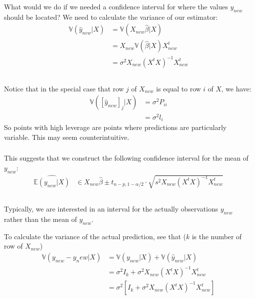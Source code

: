 \begin{frame}[fragile] \frametitle{}

What would we do if we needed a confidence interval for where
the values $y_{new}$ should be located? \pause We need to
calculate the variance of our estimator:
\begin{align*}
\mathbb{V} (\hat{y}_{new} | X) &= \mathbb{V} ( X_{new} \widehat{\beta} | X ) \\
&= X_{new} \mathbb{V} (\widehat{\beta} | X) X_{new}^t \\
&= \sigma^2 X_{new} (X^t X)^{-1} X_{new}^t \\
\end{align*}

\end{frame}

\begin{frame}[fragile] \frametitle{}

Notice that in the special case that row $j$ of $X_{new}$ is equal
to row $i$ of $X$, we have:
\begin{align*}
\mathbb{V} (\left[ \hat{y}_{new} \right]_j | X) &= \sigma^2 P_{ii} \\
&= \sigma^2 l_i
\end{align*}
So points with high leverage are points where predictions are
particularly variable. \pause This may seem counterintuitive.

\end{frame}

\begin{frame}[fragile] \frametitle{}

This suggests that we construct the following confidence interval
for the mean of $y_{new}$:
\begin{align*}
\widehat{\mathbb{E}(y_{new} | X)} &\in X_{new} \widehat{\beta} \pm t_{n-p,1-\alpha/2} \cdot
\sqrt{s^2 X_{new} (X^t X)^{-1} X_{new}^t} \\
\end{align*}

\end{frame}

\begin{frame}[fragile] \frametitle{}

Typically, we are interested in an interval for the actually
observations $y_{new}$ rather than the mean of $y_{new}$.

\pause To calculate the variance of the actual prediction,
see that ($k$ is the number of row of $X_{new}$)
\begin{align*}
\mathbb{V} (y_{new} - \hat{y}_new | X) &= \mathbb{V} (y_{new} | X) + \mathbb{V} (\hat{y}_{new} | X) \\
&= \sigma^2 I_k + \sigma^2 X_{new} (X^t X)^{-1} X_{new}^t \\
&= \sigma^2 \left[I_k + \sigma^2 X_{new} (X^t X)^{-1} X_{new}^t \right]
\end{align*}

\end{frame}


